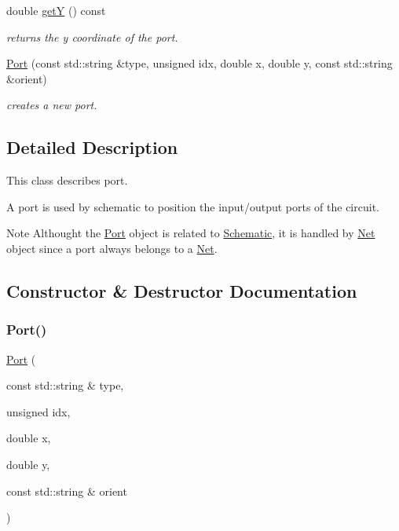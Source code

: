 \begin{DoxyCompactItemize}
\mbox{\label{class_open_chams_1_1_port_aafa51c7f8f38a09febbb9ce7853f77b4}} 
double \mbox{\hyperlink{class_open_chams_1_1_port_aafa51c7f8f38a09febbb9ce7853f77b4}{getY}} () const
\begin{DoxyCompactList}\small\item\em returns the y coordinate of the port. \end{DoxyCompactList}\item 
\mbox{\hyperlink{class_open_chams_1_1_port_ab13daf22aea531e874ff42a71b49a112}{Port}} (const std\+::string \&type, unsigned idx, double x, double y, const std\+::string \&orient)
\begin{DoxyCompactList}\small\item\em creates a new port. \end{DoxyCompactList}\end{DoxyCompactItemize}


\subsection{Detailed Description}
This class describes port.

A port is used by schematic to position the input/output ports of the circuit.

\begin{DoxyNote}{Note}
Althought the \mbox{\hyperlink{class_open_chams_1_1_port}{Port}} object is related to \mbox{\hyperlink{class_open_chams_1_1_schematic}{Schematic}}, it is handled by \mbox{\hyperlink{class_open_chams_1_1_net}{Net}} object since a port always belongs to a \mbox{\hyperlink{class_open_chams_1_1_net}{Net}}. 
\end{DoxyNote}


\subsection{Constructor \& Destructor Documentation}
\mbox{\label{class_open_chams_1_1_port_ab13daf22aea531e874ff42a71b49a112}} 
\subsubsection{\texorpdfstring{Port()}{Port()}}
{\footnotesize\ttfamily \mbox{\hyperlink{class_open_chams_1_1_port}{Port}} (\begin{DoxyParamCaption}\item[{const std\+::string \&}]{type,  }\item[{unsigned}]{idx,  }\item[{double}]{x,  }\item[{double}]{y,  }\item[{const std\+::string \&}]{orient }\end{DoxyParamCaption})\hspace{0.3cm}{\ttfamily [inline]}}



